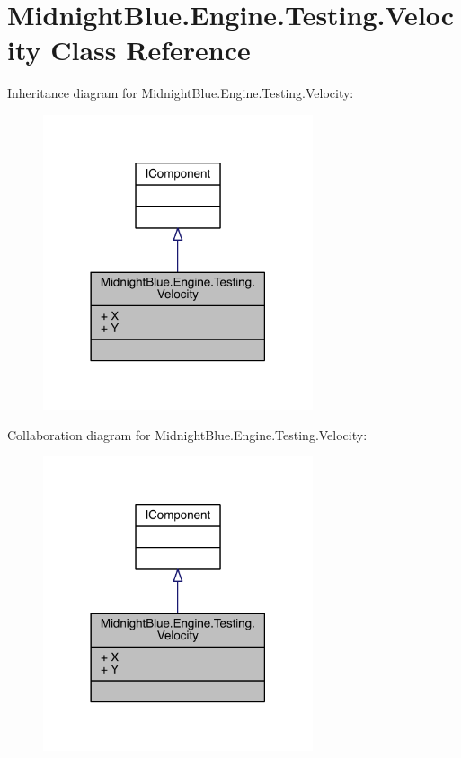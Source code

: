 \hypertarget{class_midnight_blue_1_1_engine_1_1_testing_1_1_velocity}{}\section{Midnight\+Blue.\+Engine.\+Testing.\+Velocity Class Reference}
\label{class_midnight_blue_1_1_engine_1_1_testing_1_1_velocity}


Inheritance diagram for Midnight\+Blue.\+Engine.\+Testing.\+Velocity\+:
\nopagebreak
\begin{figure}[H]
\begin{center}
\leavevmode
\includegraphics[width=225pt]{class_midnight_blue_1_1_engine_1_1_testing_1_1_velocity__inherit__graph}
\end{center}
\end{figure}


Collaboration diagram for Midnight\+Blue.\+Engine.\+Testing.\+Velocity\+:
\nopagebreak
\begin{figure}[H]
\begin{center}
\leavevmode
\includegraphics[width=225pt]{class_midnight_blue_1_1_engine_1_1_testing_1_1_velocity__coll__graph}
\end{center}
\end{figure}
